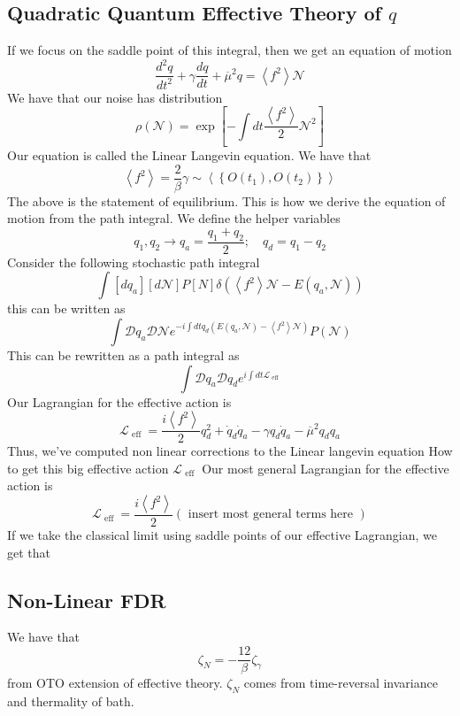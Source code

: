 \documentclass[11pt, a4paper]{article}   	%
\theoremstyle{slplain}
\begin{document}
\subsection{Quadratic Quantum Effective Theory of $ q $} 
If we focus on the saddle point of this
integral, then we get an equation of motion 
\[
 \frac{d ^ 2 q}{  d t ^  2 } + \gamma \frac{ dq }{ dt } + 
 \overline{ \mu }^ 2 q = \left< f ^ 2  \right> \mathcal{ N } 
\]  
We have that our noise has distribution 
\[
	\rho ( \mathcal{ N } ) = \exp \left[  
	 - \int dt \frac{\left< f ^ 2  \right> }{ 2 } \mathcal{ N } ^ 2 \right] 
\] Our equation is called the Linear Langevin equation. 
We have that 
\[
 \left< f ^ 2  \right> = \frac{2}{\beta } \gamma \sim \left< 
 \left\{  O ( t_1 ) , O ( t_2 )  \right\} \right>
\]  The above is the statement of equilibrium.
This is how we derive 
the equation of motion from the 
path integral. 
We define the helper variables
\[
 q_1 , q_2 \to q_ a = \frac{ q_1+ q_2 }{ 2 } ; \quad q _{ d } 
 = q_1 - q_2
\] 
Consider the following stochastic path integral 
\[
 \int \left[  dq_ a  \right]  \left[  d \mathcal{ N }  \right]

 P \left[  N  \right]  \delta ( \left< f ^ 2  \right> \mathcal{ N } 
 - E ( q_ a , \mathcal{ N } ) ) 
\] this can be written as 
\[
 \int \mathcal{ D } q_ a \mathcal{ D } \mathcal{ N } 
 e ^{  - i \int dt q_ d ( E ( q_ a , \mathcal{ N } )  - \left< f ^ 2  \right> 
 \mathcal{ N } )} P ( \mathcal{ N } ) 
\] This can 
be rewritten as 
a path integral as 
\[
 \int \mathcal{ D } q_{ a } \mathcal{D} q_{ d } e ^{ i \int dt \mathcal{ L }_{ \text{ eff } }  } 
\] Our Lagrangian for the effective action is 
\[
 \mathcal{ L } _{ \text{ eff } }  = 
 \frac{ i \left< f ^ 2  \right> }{ 2  } q_ d ^ 2 + 
 \dot{ q } _ d \dot{ q } _ a  - \gamma q _ d \dot{ q } _ a  - 
 \overline{ \mu } ^ 2 q_d  q_ a 
\] Thus, 
we've computed non linear corrections to the Linear langevin equation 
How to get this 
big effective action $ \mathcal{ L } _{ \text{ eff } }  $ 
Our most general Lagrangian for the effective action 
is 
\[
 \mathcal{ L } _{ \text{ eff } }  = \frac{i \left< f ^ 2  \right> }{2 } 
 ( \text{ insert most general terms here })
\]
If we take the classical limit 
using saddle points of our effective Lagrangian, 
we get that 

\subsection{Non-Linear FDR}
We have that 
\[
 \zeta _N =  - \frac{ 12 }{ \beta  } \zeta _{ \gamma } 
\]  from OTO extension of effective theory. 
$ \zeta _ N $ comes from time-reversal invariance and thermality of 
bath. 
\end{document}
